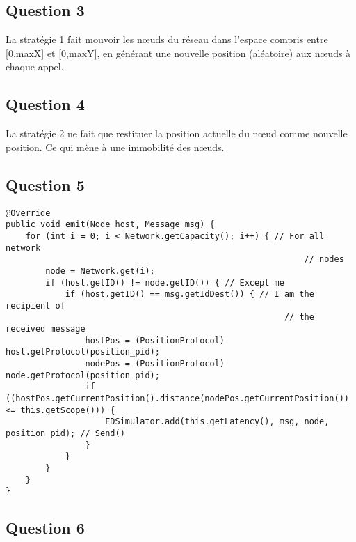 \documentclass[10pt]{report}
\begin{document}
\subsection{Question 3}
La stratégie 1 fait mouvoir les nœuds du réseau dans l'espace compris entre [0,maxX] et [0,maxY], en générant une nouvelle position (aléatoire) aux nœuds à chaque appel.

\subsection{Question 4}
La stratégie 2 ne fait que restituer la position actuelle du nœud comme nouvelle position. Ce qui mène à une immobilité des nœuds.

\subsection{Question 5}

\noindent\begin{minipage}{\textwidth}
\begin{shaded}
\begin{lstlisting}
@Override
public void emit(Node host, Message msg) {
	for (int i = 0; i < Network.getCapacity(); i++) { // For all network
															// nodes
		node = Network.get(i);
		if (host.getID() != node.getID()) { // Except me
			if (host.getID() == msg.getIdDest()) { // I am the recipient of
														// the received message
				hostPos = (PositionProtocol) host.getProtocol(position_pid);
				nodePos = (PositionProtocol) node.getProtocol(position_pid);
				if ((hostPos.getCurrentPosition().distance(nodePos.getCurrentPosition()) <= this.getScope())) {
					EDSimulator.add(this.getLatency(), msg, node, position_pid); // Send()
				}
			}
		}
	}
}
\end{lstlisting}
\end{shaded}
\end{minipage}



\subsection{Question 6}
\end{document}
